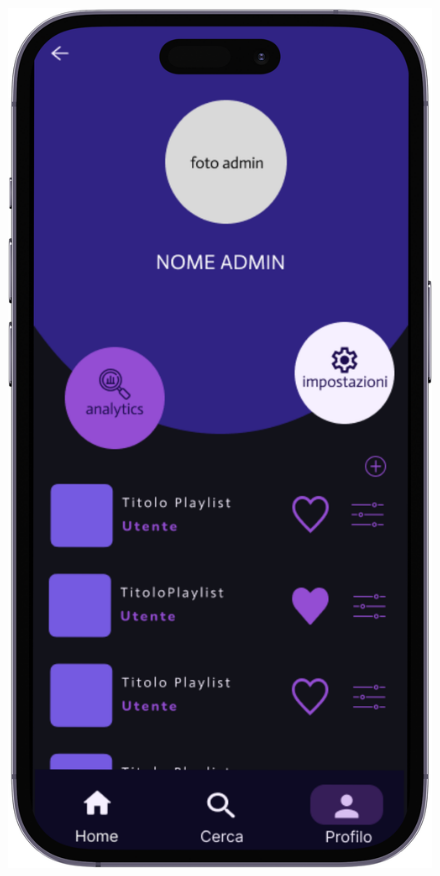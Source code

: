 \documentclass{article}
\begin{document}
\begin{figure}[htbp]
\begin{minipage}{0.18\textwidth}
					\includegraphics[width=\textwidth]{Immagini/foto6}
				\end{minipage}
				\hfill
				\begin{minipage}{0.18\textwidth}

\end{minipage}
\end{figure}
\end{document}
